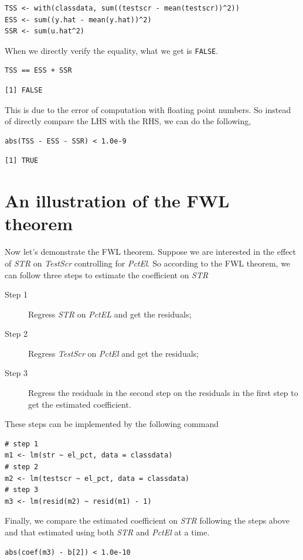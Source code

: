 \documentclass[11pt]{article}
\begin{document}
\begin{verbatim}
TSS <- with(classdata, sum((testscr - mean(testscr))^2))
ESS <- sum((y.hat - mean(y.hat))^2)
SSR <- sum(u.hat^2)
\end{verbatim}

When we directly verify the equality, what we get is \texttt{FALSE}.
\begin{verbatim}
TSS == ESS + SSR
\end{verbatim}

\begin{verbatim}
[1] FALSE
\end{verbatim}

This is due to the error of computation with floating point
numbers. So instead of directly compare the LHS with the RHS, we can
do the following,
\begin{verbatim}
abs(TSS - ESS - SSR) < 1.0e-9
\end{verbatim}

\begin{verbatim}
[1] TRUE
\end{verbatim}

\section{An illustration of the FWL theorem}
\label{sec:orgbf33154}
Now let's demonstrate the FWL theorem. Suppose we are interested in
the effect of \emph{STR} on \emph{TestScr} controlling for \emph{PctEl}. So according
to the FWL theorem, we can follow three steps to estimate the
coefficient on \emph{STR}
\begin{description}
\item[{Step 1}] Regress \emph{STR} on \emph{PctEL} and get the residuals;
\item[{Step 2}] Regress \emph{TestScr} on \emph{PctEl} and get the residuals;
\item[{Step 3}] Regress the residuals in the second step on the residuals
in the first step to get the estimated coefficient.
\end{description}
These steps can be implemented by the following command
\begin{verbatim}
# step 1
m1 <- lm(str ~ el_pct, data = classdata)
# step 2
m2 <- lm(testscr ~ el_pct, data = classdata)
# step 3
m3 <- lm(resid(m2) ~ resid(m1) - 1)
\end{verbatim}

Finally, we compare the estimated coefficient on \emph{STR} following the
steps above and that estimated using both \emph{STR} and \emph{PctEl} at a
time.
\begin{verbatim}
abs(coef(m3) - b[2]) < 1.0e-10
\end{verbatim}
\end{document}
